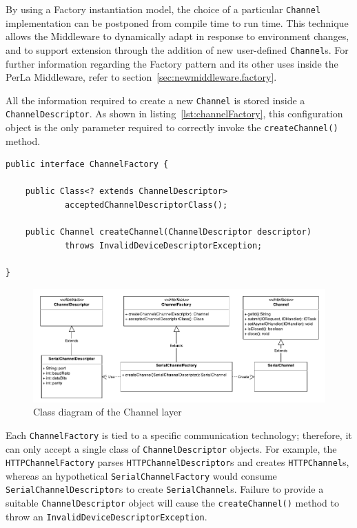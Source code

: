 By using a Factory instantiation model, the choice of a particular
\texttt{Channel} implementation can be postponed from compile time to run time.
This technique allows the Middleware to dynamically adapt in response to
environment changes, and to support extension through the addition of new
user-defined \texttt{Channel}s. For further information regarding the Factory
pattern and its other uses inside the PerLa Middleware, refer to
section~\ref{sec:newmiddleware.factory}.

All the information required to create a new \texttt{Channel} is stored inside
a \texttt{ChannelDescriptor}. As shown in listing~\ref{lst:channelFactory},
this configuration object is the only parameter required to correctly invoke
the \texttt{createChannel()} method.

\lstset{language=Java}
\begin{lstlisting}[float,caption=The ChannelFactory
interface,label={lst:channelFactory}]
public interface ChannelFactory {

	public Class<? extends ChannelDescriptor>
			acceptedChannelDescriptorClass();

	public Channel createChannel(ChannelDescriptor descriptor)
			throws InvalidDeviceDescriptorException;

}
\end{lstlisting}

\begin{figure}[h!]
\includegraphics[width=\textwidth]{imgs/channel_factory.pdf}
\caption{Class diagram of the Channel layer}
\end{figure}

Each \texttt{ChannelFactory} is tied to a specific communication technology;
therefore, it can only accept a single class of \texttt{ChannelDescriptor}
objects. For example, the \texttt{HTTPChannelFactory} parses
\texttt{HTTPChannelDescriptor}s and creates \texttt{HTTPChannel}s, whereas an
hypothetical \texttt{SerialChannelFactory} would consume
\texttt{SerialChannelDescriptor}s to create \texttt{SerialChannel}s. Failure to
provide a suitable \texttt{ChannelDescriptor} object will cause the
\texttt{createChannel()} method to throw an
\texttt{InvalidDeviceDescriptorException}.

